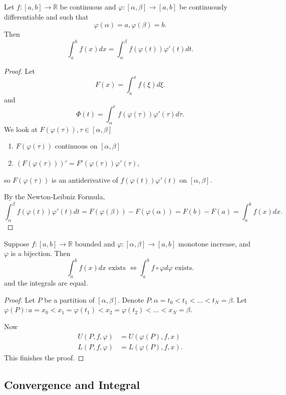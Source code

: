 \begin{theorem}
	Let $f:[a,b] \to \mathbb{R}$ be continuous and $\varphi: [\alpha,\beta] \to [a,b]$ be continuously differentiable and such that
	\[
		\varphi(\alpha) = a, \varphi(\beta) = b
	.\] 
	Then
	\[
		\int_a^b f(x) dx = \int_\alpha^\beta f(\varphi(t))\varphi'(t) dt
	.\] 
\end{theorem}
\begin{proof}
	Let \[
		F(x) = \int_a^x f(\xi) d\xi
	.\] 
	and
	\[
		\Phi(t) = \int_\alpha^t f(\varphi(\tau)) \varphi'(\tau) d\tau
	.\] 
	We look at $F(\varphi(\tau)), \tau \in [\alpha,\beta]$ 

	\begin{enumerate}
		\item $F(\varphi(\tau))$ continuous on $[\alpha, \beta]$ 
		\item $(F(\varphi(\tau)))' = F'(\varphi(\tau)) \varphi'(\tau)$,  
	\end{enumerate}
	so $F(\varphi(\tau))$ is an antiderivative of $f(\varphi(t) )\varphi'(t)$ on $[\alpha, \beta].$

	By the Newton-Leibniz Formula,
	\[
		\int_\alpha^\beta f(\varphi(t))\varphi'(t) dt = F(\varphi(\beta)) - F(\varphi(\alpha)) = F(b) - F(a) = \int_a^b f(x) dx
	.\] 
\end{proof}

\begin{theorem}
	Suppose $f: [a,b] \to \mathbb{R}$ bounded and $\varphi: [\alpha, \beta] \to  [a,b]$ monotone increase, and $\varphi$ is a bijection. Then
	\[
		\int _a^b f(x) dx \text{ exists }\iff 
		\int _a^b f \circ \varphi d \varphi \text{ exists}
	.\] 
	and the integrals are equal.
\end{theorem}
\begin{proof}
	Let $P$ be a partition of $[\alpha, \beta]$. Denote $P: \alpha = t_0 < t_1< \ldots < t_N = \beta$. Let $\varphi(P): a = x_0 < x_1 = \varphi(t_1) < x_2=\varphi(t_2) < \ldots < x_N = \beta$.

	Now
	\begin{align*}
		U(P, f, \varphi) &= U(\varphi(P), f, x)\\
		L(P, f, \varphi) &= L(\varphi(P), f, x)
	.\end{align*}
	This finishes the proof.
\end{proof}


\subsection{Convergence and Integral}

